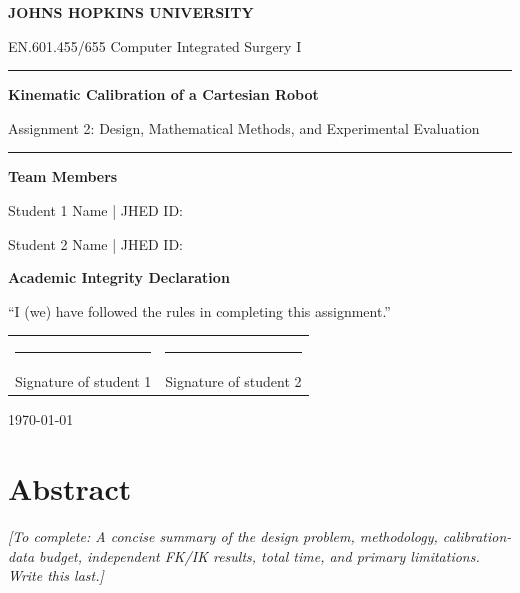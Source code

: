 \documentclass[11pt,letterpaper]{article}
\newcommand{\coursename}{EN.601.455/655 Computer Integrated Surgery I}
\newcommand{\reporttitle}{Kinematic Calibration of a Cartesian Robot}
\newcommand{\reportsubtitle}{Assignment 2: Design, Mathematical Methods, and Experimental Evaluation}
\newcommand{\teammemberone}{Student 1 Name \quad | \quad JHED ID: \underline{\hspace{1.25in}}}
\newcommand{\teammembertwo}{Student 2 Name \quad | \quad JHED ID: \underline{\hspace{1.25in}}}
\newcommand{\placeholder}[1]{{\color{placeholdergray}\itshape [To complete: #1]}}
\begin{document}
\hypersetup{pageanchor=false}
\begin{titlepage}
  \thispagestyle{empty}
  \vspace*{1.1in}
  {\large\bfseries\color{accent} JOHNS HOPKINS UNIVERSITY\par}
  \vspace{0.13in}
  {\normalsize\color{slate}\coursename\par}
  \vspace{0.5in}
  {\color{darkblue}\rule{\textwidth}{1.2pt}\par}
  \vspace{0.22in}
  {\Huge\bfseries\color{darkblue}\reporttitle\par}
  \vspace{0.18in}
  {\Large\color{slate}\reportsubtitle\par}
  \vspace{0.25in}
  {\color{darkblue}\rule{\textwidth}{0.6pt}\par}
  \vspace{0.6in}
  {\large\bfseries Team Members\par}
  \vspace{0.13in}
  \teammemberone\par
  \teammembertwo\par
  \vspace{0.38in}
  {\large\bfseries Academic Integrity Declaration\par}
  \vspace{0.1in}
  ``I (we) have followed the rules in completing this assignment.''\par
  \vspace{0.19in}
  \begin{tabularx}{\linewidth}{@{}X X@{}}
    \rule{0.92\linewidth}{0.35pt} & \rule{0.92\linewidth}{0.35pt}\\
    \small Signature of student 1 & \small Signature of student 2
  \end{tabularx}
  \vfill
  {\color{slate}\today\par}
\end{titlepage}

\setcounter{page}{1}
\section*{Abstract}
\placeholder{A concise summary of the design problem, methodology, calibration-data budget, independent FK/IK results, total time, and primary limitations. Write this last.}
\end{document}

